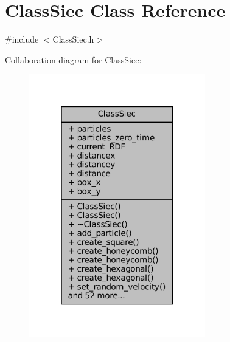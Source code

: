 \hypertarget{classClassSiec}{}\section{Class\+Siec Class Reference}
\label{classClassSiec}


{\ttfamily \#include $<$Class\+Siec.\+h$>$}



Collaboration diagram for Class\+Siec\+:
\nopagebreak
\begin{figure}[H]
\begin{center}
\leavevmode
\includegraphics[width=217pt]{classClassSiec__coll__graph}
\end{center}
\end{figure}
